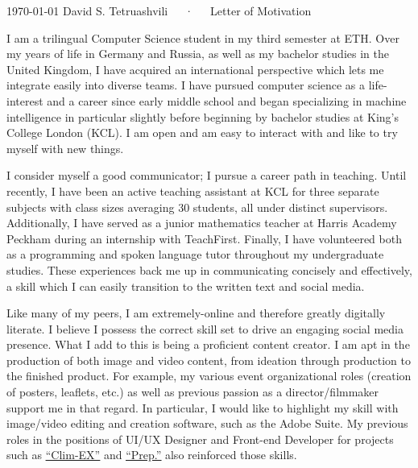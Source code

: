 \documentclass[11pt, a4paper]{awesome-cv}
\begin{document}
\makecvheader[R]

\makecvfooter
  {\today}
  {David S. Tetruashvili~~~·~~~Letter of Motivation}
  {}

\makelettertitle

\begin{cvletter}

I am a trilingual Computer Science student in my third semester at ETH. Over my years of life in Germany and Russia, as well as my bachelor studies in the United Kingdom, I have acquired an international perspective which lets me integrate easily into diverse teams. I have pursued computer science as a life-interest and a career since early middle school and began specializing in machine intelligence in particular slightly before beginning by bachelor studies at King’s College London (KCL). I am open and am easy to interact with and like to try myself with new things.

I consider myself a good communicator; I pursue a career path in teaching. Until recently, I have been an active teaching assistant at KCL for three separate subjects with class sizes averaging 30 students, all under distinct supervisors. Additionally, I have served as a junior mathematics teacher at Harris Academy Peckham during an internship with TeachFirst. Finally, I have volunteered both as a programming and spoken language tutor throughout my undergraduate studies. These experiences back me up in communicating concisely and effectively, a skill which I can easily transition to the written text and social media.

Like many of my peers, I am extremely-online and therefore greatly digitally literate. I believe I possess the correct skill set to drive an engaging social media presence. What I add to this is being a proficient content creator. I am apt in the production of both image and video content, from ideation through production to the finished product. For example, my various event organizational roles (creation of posters, leaflets, etc.) as well as previous passion as a director/filmmaker support me in that regard. In particular, I would like to highlight my skill with image/video editing and creation software, such as the Adobe Suite. My previous roles in the positions of UI/UX Designer and Front-end Developer for projects such as \href{https://github.com/davzzar/clim-EX}{\underline{``Clim-EX''}} and \href{https://davzzar.github.io/prep-page/}{\underline{``Prep.''}} also reinforced those skills.


\end{cvletter}
\end{document}
